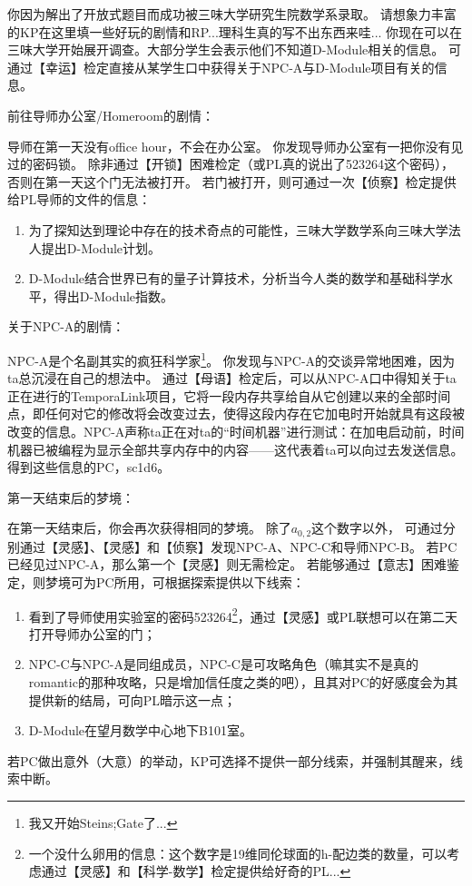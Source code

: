 \documentclass[12pt]{report}
\begin{document}
\color{black}
你因为解出了开放式题目而成功被三味大学研究生院数学系录取。
\color{red}
请想象力丰富的KP在这里填一些好玩的剧情和RP...理科生真的写不出东西来哇...
\color{black}
你现在可以在三味大学开始展开调查。大部分学生会表示他们不知道D-Module相关的信息。
\color{blue}
可通过【幸运】检定直接从某学生口中获得关于NPC-A与D-Module项目有关的信息。

\color{green}
前往导师办公室/Homeroom的剧情：

\color{black}
导师在第一天没有office hour，不会在办公室。
你发现导师办公室有一把你没有见过的密码锁。
\color{blue}
除非通过【开锁】困难检定（或PL真的说出了523264这个密码），否则在第一天这个门无法被打开。
若门被打开，则可通过一次【侦察】检定提供给PL导师的文件的信息：
\begin{enumerate}
\item 为了探知达到理论中存在的技术奇点的可能性，三味大学数学系向三味大学法人提出D-Module计划。
\item D-Module结合世界已有的量子计算技术，分析当今人类的数学和基础科学水平，得出D-Module指数。
\end{enumerate}

\color{green}
关于NPC-A的剧情：

\color{red}
NPC-A是个名副其实的疯狂科学家\footnote{\color{red}我又开始Steins;Gate了...}。
\color{black}
你发现与NPC-A的交谈异常地困难，因为ta总沉浸在自己的想法中。
\color{blue}
通过【母语】检定后，可以从NPC-A口中得知关于ta正在进行的TemporaLink项目，它将一段内存共享给自从它创建以来的全部时间点，即任何对它的修改将会改变过去，使得这段内存在它加电时开始就具有这段被改变的信息。NPC-A声称ta正在对ta的“时间机器”进行测试：在加电启动前，时间机器已被编程为显示全部共享内存中的内容——这代表着ta可以向过去发送信息。
\color{red}
得到这些信息的PC，sc1d6。

\color{green}
第一天结束后的梦境：

\color{black}
在第一天结束后，你会再次获得相同的梦境。
除了$a_{0,2}$这个数字以外，
\color{blue}
可通过分别通过【灵感】、【灵感】和【侦察】发现NPC-A、NPC-C和导师NPC-B。
若PC已经见过NPC-A，那么第一个【灵感】则无需检定。
若能够通过【意志】困难鉴定，则梦境可为PC所用，可根据探索提供以下线索：
\begin{enumerate}
\item 看到了导师使用实验室的密码523264\footnote{\color{blue}一个没什么卵用的信息：这个数字是19维同伦球面的h-配边类的数量，可以考虑通过【灵感】和【科学-数学】检定提供给好奇的PL...}，通过【灵感】或PL联想可以在第二天打开导师办公室的门；
\item NPC-C与NPC-A是同组成员，\color{red}NPC-C是可攻略角色（嘛其实不是真的romantic的那种攻略，只是增加信任度之类的吧），且其对PC的好感度会为其提供新的结局，可向PL暗示这一点\color{blue}；
\item D-Module在望月数学中心地下B101室。
\end{enumerate}
\color{red}
若PC做出意外（大意）的举动，KP可选择不提供一部分线索，并强制其醒来，线索中断。
\end{document}
